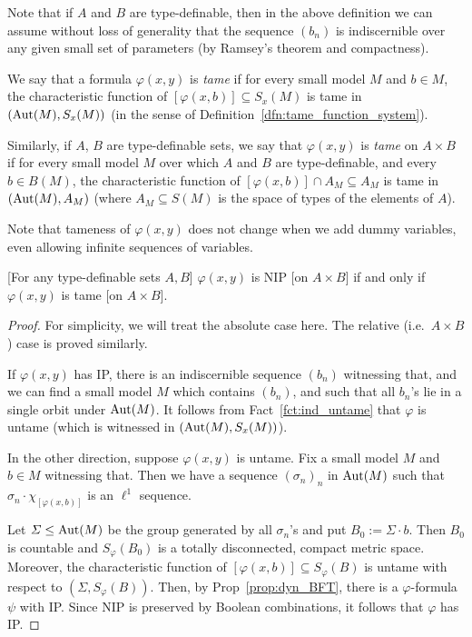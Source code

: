 	\begin{rem}
		\label{rem:NIP_indiscernible}
		Note that if $A$ and $B$ are type-definable, then in the above definition we can assume without loss of generality that the sequence $(b_n)$ is indiscernible over any given small set of parameters (by Ramsey's theorem and compactness).\xqed{\lozenge}
	\end{rem}
	
	\begin{dfn}
		\label{dfn:tame_formula}
		We say that a formula $\varphi(x,y)$ is \emph{tame} if for every small model $M$ and $b\in M$, the characteristic function of $[\varphi(x,b)]\subseteq S_x(M)$ is tame in $(\operatorname{{Aut}}(M),S_x(M))$ (in the sense of Definition~\ref{dfn:tame_function_system}).
		
		Similarly, if $A$, $B$ are type-definable sets, we say that $\varphi(x,y)$ is {\em tame} on $A\times B$ if for every small model $M$ over which $A$ and $B$ are type-definable, and every $b\in B(M)$, the characteristic function of $[\varphi(x,b)]\cap A_M\subseteq A_M$ is tame in $(\operatorname{{Aut}}(M),A_M)$ (where $A_M\subseteq S(M)$ is the space of types of the elements of $A$).
		\xqed{\lozenge}
	\end{dfn}
	
	Note that tameness of $\varphi(x,y)$ does not change when we add dummy variables, even allowing infinite sequences of variables.
	
	\begin{lem}\label{lem:NIP_tame}
		[For any type-definable sets $A,B$] $\varphi(x,y)$ is NIP [on $A\times B$] if and only if $\varphi(x,y)$ is tame [on $A\times B$].
	\end{lem}
	\begin{proof}
		For simplicity, we will treat the absolute case here. The relative (i.e.\ $A\times B$) case is proved similarly.
		
		If $\varphi(x,y)$ has IP, there is an indiscernible sequence $(b_n)$ witnessing that, and we can find a small model $M$ which contains $(b_n)$, and such that
		all $b_n$'s lie in a single orbit under $\operatorname{{Aut}}(M)$.
		It follows from Fact~\ref{fct:ind_untame} that $\varphi$ is untame (which is witnessed in $(\operatorname{{Aut}}(M),S_x(M))$).
		
		In the other direction, suppose $\varphi(x,y)$ is untame. Fix a small model $M$ and $b\in M$ witnessing that. Then we have a sequence $(\sigma_n)_n$ in $\operatorname{{Aut}}(M)$ such that $\sigma_n\cdot \chi_{[\varphi(x,b)]}$ is an $\ell^1$ sequence.
		
		Let $\Sigma\leq \operatorname{{Aut}}(M)$ be the group generated by all $\sigma_n$'s and put $B_0:=\Sigma\cdot b$. Then $B_0$ is countable and $S_{\varphi}(B_0)$ is a totally disconnected, compact metric space. Moreover, the characteristic function of $[\varphi(x,b)]\subseteq S_\varphi(B)$ is untame with respect to $(\Sigma,S_{\varphi}(B))$. Then, by Prop~\ref{prop:dyn_BFT}, there is a $\varphi$-formula $\psi$ with IP. Since NIP is preserved by Boolean combinations, it follows that $\varphi$ has IP.
	\end{proof}
	
